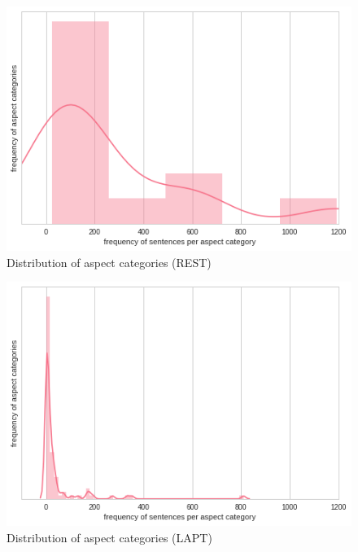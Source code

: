 \documentclass[comsoc,conference]{IEEEtran}
\begin{document}
\begin{figure}[!htbp]
\centering
\includegraphics[scale=0.5]{images/anal_asp-freq_REST.png}
\caption{Distribution of aspect categories (REST)}
\end{figure}
\begin{figure}[!htbp]
\centering
\includegraphics[scale=0.5]{images/anal_asp-freq_LAPT.png}
\caption{Distribution of aspect categories (LAPT)}
\end{figure}



\end{document}
